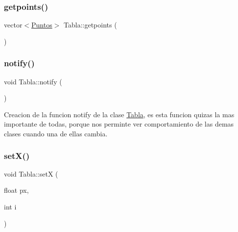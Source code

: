 \mbox{\label{class_tabla_adde65e47058aaa09ab20d450f713894a}} 
\subsubsection{\texorpdfstring{getpoints()}{getpoints()}}
{\footnotesize\ttfamily vector$<$\mbox{\hyperlink{class_puntos}{Puntos}}$>$ Tabla\+::getpoints (\begin{DoxyParamCaption}{ }\end{DoxyParamCaption})\hspace{0.3cm}{\ttfamily [inline]}}

\mbox{\label{class_tabla_a6d72bb617a151e335756b0615269b81e}} 
\subsubsection{\texorpdfstring{notify()}{notify()}}
{\footnotesize\ttfamily void Tabla\+::notify (\begin{DoxyParamCaption}{ }\end{DoxyParamCaption})}

Creacion de la funcion notify de la clase \mbox{\hyperlink{class_tabla}{Tabla}}, es esta funcion quizas la mas importante de todas, porque nos perminte ver comportamiento de las demas clases cuando una de ellas cambia. \mbox{\label{class_tabla_a5406268bade1eacd5e9aac2d7dfefea6}} 
\subsubsection{\texorpdfstring{setX()}{setX()}}
{\footnotesize\ttfamily void Tabla\+::setX (\begin{DoxyParamCaption}\item[{float}]{px,  }\item[{int}]{i }\end{DoxyParamCaption})\hspace{0.3cm}{\ttfamily [inline]}}

\mbox{\label{class_tabla_a93caa15edb104673131a9970c8284034}} 
